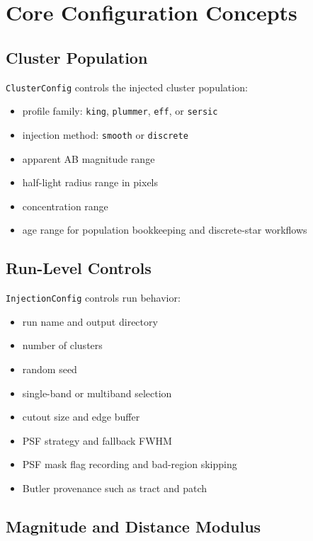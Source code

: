 \documentclass[11pt]{article}
\begin{document}
\section{Core Configuration Concepts}

\subsection{Cluster Population}

\texttt{ClusterConfig} controls the injected cluster population:

\begin{itemize}[leftmargin=*]
    \item profile family: \texttt{king}, \texttt{plummer}, \texttt{eff}, or \texttt{sersic}
    \item injection method: \texttt{smooth} or \texttt{discrete}
    \item apparent AB magnitude range
    \item half-light radius range in pixels
    \item concentration range
    \item age range for population bookkeeping and discrete-star workflows
\end{itemize}

\subsection{Run-Level Controls}

\texttt{InjectionConfig} controls run behavior:

\begin{itemize}[leftmargin=*]
    \item run name and output directory
    \item number of clusters
    \item random seed
    \item single-band or multiband selection
    \item cutout size and edge buffer
    \item PSF strategy and fallback FWHM
    \item PSF mask flag recording and bad-region skipping
    \item Butler provenance such as tract and patch
\end{itemize}

\subsection{Magnitude and Distance Modulus}
\end{document}
